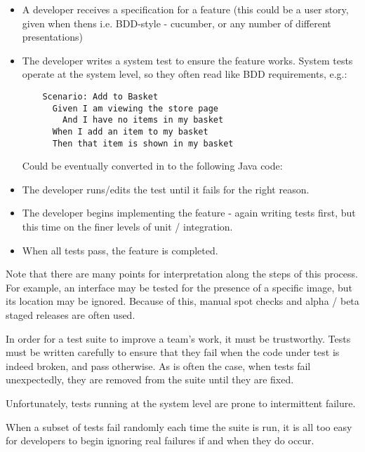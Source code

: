 \begin{itemize}
	\item A developer receives a specification for a feature (this could be a user story, given when thens i.e. BDD-style - cucumber, or any number of different presentations)

	\item The developer writes a system test to ensure the feature works. System tests operate at the system level, so they often read like BDD requirements, e.g.:

	\begin{verbatim}
  	Scenario: Add to Basket
  	  Given I am viewing the store page
  	    And I have no items in my basket
  	  When I add an item to my basket
  	  Then that item is shown in my basket
	\end{verbatim}

	Could be eventually converted in to the following Java code:

	

	\item The developer runs/edits the test until it fails for the right reason.

	\item The developer begins implementing the feature - again writing tests first, but this time on the finer levels of unit / integration.

	\item When all tests pass, the feature is completed.
\end{itemize}

Note that there are many points for interpretation along the steps of this process. For example, an interface may be tested for the presence of a specific image, but its location may be ignored. Because of this, manual spot checks and alpha / beta staged releases are often used.

In order for a test suite to improve a team’s work, it must be trustworthy. Tests must be written carefully to ensure that they fail when the code under test is indeed broken, and pass otherwise. As is often the case, when tests fail unexpectedly, they are removed from the suite until they are fixed.

Unfortunately, tests running at the system level are prone to intermittent failure.

When a subset of tests fail randomly each time the suite is run, it is all too easy for developers to begin ignoring real failures if and when they do occur.

